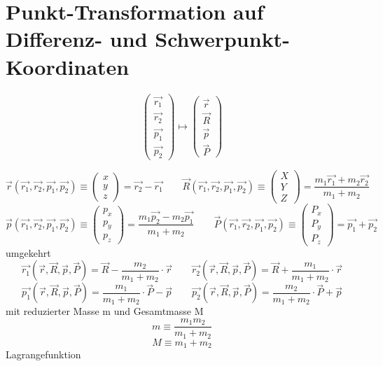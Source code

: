 \documentclass[11pt]{article} %
\begin{document}
\section{Punkt-Transformation auf Differenz- und Schwerpunkt-Koordinaten}
\[
\begin{pmatrix}
\vec{r_1} \\ \vec{r_2} \\ \vec{p_1} \\ \vec{p_2}
\end{pmatrix}
\mapsto
\begin{pmatrix}
\vec{r} \\ \vec{R} \\ \vec{p} \\ \vec{P}
\end{pmatrix}
\]

\[ 
\vec{r}(\vec{r_1},\vec{r_2},\vec{p_1},\vec{p_2}) \equiv \begin{pmatrix} x \\ y \\ z \end{pmatrix} = \vec{r_2} - \vec{r_1} \quad \quad
\vec{R}(\vec{r_1},\vec{r_2},\vec{p_1},\vec{p_2}) \equiv \begin{pmatrix} X \\ Y \\ Z \end{pmatrix} = \frac {m_1\vec{r_1} + m_2\vec{r_2}} {m_1 + m_2} 
\]
\[ 
\vec{p}(\vec{r_1},\vec{r_2},\vec{p_1},\vec{p_2}) \equiv \begin{pmatrix} p_x \\ p_y \\ p_z \end{pmatrix} = \frac{ m_1\vec{p_2} - m_2\vec{p_1}}{m_1+m_2} \quad \quad
\vec{P}(\vec{r_1},\vec{r_2},\vec{p_1},\vec{p_2}) \equiv \begin{pmatrix} P_x \\ P_y \\ P_z \end{pmatrix} = \vec{p_1} + \vec{p_2} 
\]
umgekehrt
\[ 
\vec{r_1}(\vec{r},\vec{R},\vec{p},\vec{P}) = \vec{R} - \frac{m_2}{m_1 + m_2}\cdot \vec{r} \quad \quad
\vec{r_2}(\vec{r},\vec{R},\vec{p},\vec{P}) = \vec{R} + \frac{m_1}{m_1 + m_2} \cdot \vec{r} 
\]
\[ 
\vec{p_1}(\vec{r},\vec{R},\vec{p},\vec{P}) = \frac{m_1}{m_1 + m_2}\cdot \vec{P} - \vec{p} \quad \quad
\vec{p_2}(\vec{r},\vec{R},\vec{p},\vec{P}) = \frac{m_2}{m_1 + m_2}\cdot \vec{P} + \vec{p} 
\]
mit reduzierter Masse m und Gesamtmasse M
\[ m \equiv \frac{m_1 m_2}{m_1 + m_2} \]
\[ M \equiv m_1 + m_2 \]
Lagrangefunktion
\end{document}
